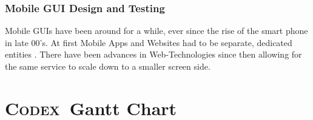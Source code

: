 \documentclass[review]{cmpreport}
\newcommand{\Codex}{\textsc{Codex}}
\begin{document}
	\subsubsection{Mobile GUI Design and Testing}
	Mobile GUIs have been around for a while, ever since the rise of the smart phone in late 00's. At first Mobile Apps and Websites had to be separate, dedicated entities \citep{MobileUsability}. There have been advances in Web-Technologies since then allowing for the same service to scale down to a smaller screen side. 
	
	\clearpage
	
	\appendix
	
	\section{\Codex \ Gantt Chart}
\end{document}
